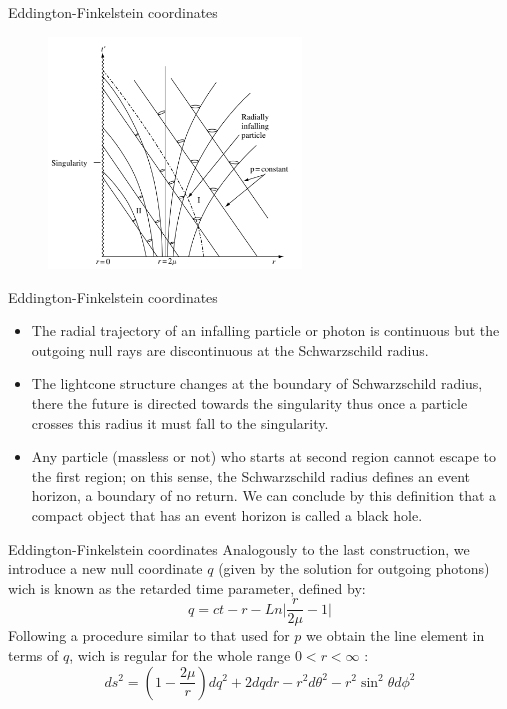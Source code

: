 \documentclass[xcolor=dvipsnames]{beamer}
\begin{document}
\begin{frame}{Eddington-Finkelstein coordinates}
\begin{figure}
    \centering
    \includegraphics[width=0.6\textwidth]{Presentations/Images/4_bhfinkelstein.png}
\end{figure}
\end{frame}
\begin{frame}{Eddington-Finkelstein coordinates}
\begin{itemize}

\item The radial trajectory of an infalling particle or photon is continuous but the outgoing null rays are discontinuous at the Schwarzschild radius. 
\item The lightcone structure changes at the boundary of Schwarzschild radius, there the future is directed towards the singularity thus once a particle crosses this radius it must fall to the singularity. 
\item Any particle (massless or not) who starts at second region cannot escape to the  first region; on this sense, the Schwarzschild radius defines an event horizon, a boundary of no return. We can conclude by this definition that a compact object that has an event horizon is called a black hole.\\
\end{itemize}
\end{frame}
\begin{frame}{Eddington-Finkelstein coordinates}
 Analogously to the last construction, we introduce a new null coordinate $q$ (given by the solution for outgoing photons) wich is known as the retarded time parameter, defined by:
\begin{equation}
    q= ct - r - Ln\Big| \frac{r}{2\mu}-1 \Big|\label{46}
\end{equation}
Following a procedure similar to that used for $p$ we obtain the line element in terms of $q$, wich is regular for the whole range $0<r<\infty$ :
\begin{equation}
ds^2 =\left( 1 - \frac{2\mu}{r}\right)dq^2+2dqdr- r^2 d\theta^2 - r^2 \sin^2 \theta d\phi^2 \label{5}
\end{equation}

\end{frame}
\end{document}
